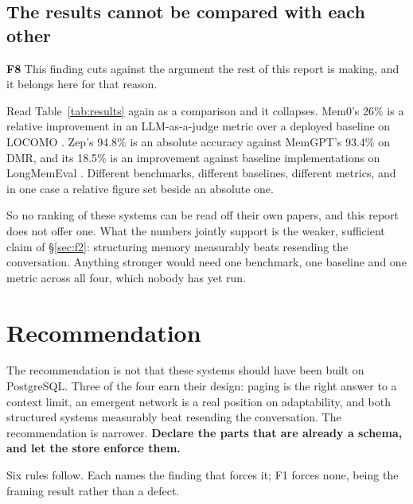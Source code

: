\documentclass[11pt,a4paper]{article}
\newcommand{\finding}[1]{{\sffamily\bfseries\color{blue800}#1}\quad}
\begin{document}
\subsection{The results cannot be compared with each other}
\label{sec:f8}

\finding{F8} This finding cuts against the argument the rest of this
report is making, and it belongs here for that reason.

Read Table~\ref{tab:results} again as a comparison and it collapses.
Mem0's 26\% is a relative improvement in an LLM-as-a-judge metric over a
deployed baseline on LOCOMO \cite{mem0}. Zep's 94.8\% is an absolute
accuracy against MemGPT's 93.4\% on DMR, and its 18.5\% is an improvement
against baseline implementations on LongMemEval \cite{zep}. Different
benchmarks, different baselines, different metrics, and in one case a
relative figure set beside an absolute one.

So no ranking of these systems can be read off their own papers, and this
report does not offer one. What the numbers jointly support is the
weaker, sufficient claim of \S\ref{sec:f2}: structuring memory measurably
beats resending the conversation. Anything stronger would need one
benchmark, one baseline and one metric across all four, which nobody has
yet run.

\clearpage
\section{Recommendation}
\label{sec:rec}

The recommendation is not that these systems should have been built on
PostgreSQL. Three of the four earn their design: paging is the right
answer to a context limit, an emergent network is a real position on
adaptability, and both structured systems measurably beat resending the
conversation. The recommendation is narrower. \textbf{Declare the parts
that are already a schema, and let the store enforce them.}

Six rules follow. Each names the finding that forces it; F1 forces none,
being the framing result rather than a defect.
\end{document}
